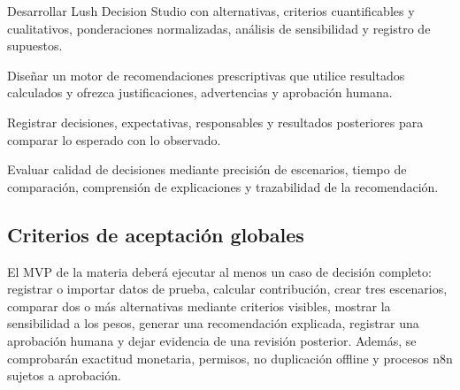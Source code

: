 \begin{vinetas}
\item Desarrollar Lush Decision Studio con alternativas, criterios cuantificables y cualitativos, ponderaciones normalizadas, análisis de sensibilidad y registro de supuestos.
\item Diseñar un motor de recomendaciones prescriptivas que utilice resultados calculados y ofrezca justificaciones, advertencias y aprobación humana.
\item Registrar decisiones, expectativas, responsables y resultados posteriores para comparar lo esperado con lo observado.
\item Evaluar calidad de decisiones mediante precisión de escenarios, tiempo de comparación, comprensión de explicaciones y trazabilidad de la recomendación.
\end{vinetas}

\subsection{Criterios de aceptación globales}

El MVP de la materia deberá ejecutar al menos un caso de decisión completo: registrar o importar datos de prueba, calcular contribución, crear tres escenarios, comparar dos o más alternativas mediante criterios visibles, mostrar la sensibilidad a los pesos, generar una recomendación explicada, registrar una aprobación humana y dejar evidencia de una revisión posterior. Además, se comprobarán exactitud monetaria, permisos, no duplicación offline y procesos n8n sujetos a aprobación.

